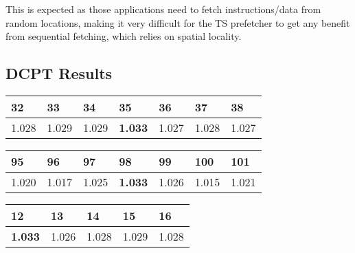 This is expected as those applications need to fetch instructions/data from
random locations, making it very difficult for the TS prefetcher
to get any benefit from sequential fetching, which relies on spatial locality.

\subsection{DCPT Results}

\begin{table}[h]
\begin{tabular}{|l|l|l|l|l|l|l|}
\hline
32    & 33    & 34    & \textbf{35}    & 36    & 37    & 38    \\ \hline
1.028 & 1.029 & 1.029 & \textbf{1.033} & 1.027 & 1.028 & 1.027 \\ \hline
\end{tabular}
\end{table}

\begin{table}[h]
\begin{tabular}{|l|l|l|l|l|l|l|}
\hline
95    & 96    & 97    & \textbf{98}    & 99    & 100   & 101   \\ \hline
1.020 & 1.017 & 1.025 & \textbf{1.033} & 1.026 & 1.015 & 1.021 \\ \hline
\end{tabular}
\end{table}

\begin{table}[h]
\begin{tabular}{|l|l|l|l|l|}
\hline
\textbf{12}    & 13    & 14    & 15    & 16    \\ \hline
\textbf{1.033} & 1.026 & 1.028 & 1.029 & 1.028 \\ \hline
\end{tabular}
\end{table}




